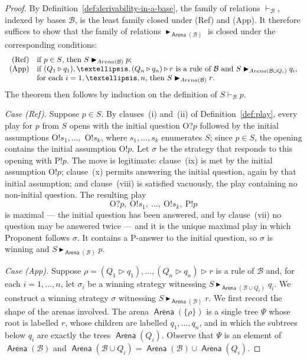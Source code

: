 \documentclass[10pt,a4paper]{amsart}
\newcommand{\base}[1]{\mathcal{#1}}                    %
\newcommand{\brule}[1]{\triangleright{#1}}         %
\newcommand{\deriv}[1]{\vdash_{#1}}       %
\newcommand{\toarena}[1]{\mathrel{\textsf{Arena}}(#1)}           %
\newcommand{\wstrat}[1]{\blacktriangleright_{#1}}            %
\begin{document}
\begin{proof}
By Definition~\ref{def:derivability-in-a-base}, the family of relations
$\deriv{\base{B}}$, indexed by bases $\base{B}$, is the least family closed
under (Ref) and (App). It therefore suffices to show that the family of
relations $\wstrat{\toarena{\base{B}}}$ is closed under the corresponding
conditions:
\[
\begin{array}{rl}
    \mbox{\rm (Ref)} & \mbox{if $p \in S$, then $S \wstrat{\toarena{\base{B}}} p$;} \\
    \mbox{\rm (App)} & \mbox{if $(Q_1 \brule q_1), \ldots, (Q_n \brule q_n)
        \brule r$ is a rule of $\base{B}$ and
        $S \wstrat{\toarena{\base{B} \cup Q_i}} q_i$,} \\
        & \mbox{for each $i = 1, \ldots, n$, then $S \wstrat{\toarena{\base{B}}} r$.}
\end{array}
\]
The theorem then follows by induction on the definition of
$S \deriv{\base{B}} p$.
 
\medskip
 
\noindent\emph{Case (Ref).} Suppose $p \in S$. By clauses~(i) and~(ii) of
Definition~\ref{def:play}, every play for $p$ from $S$ opens with the initial
question O?$p$ followed by the initial assumptions O!$s_1, \ldots,$ O!$s_k$,
where $s_1, \ldots, s_k$ enumerates $S$; since $p \in S$, the opening contains
the initial assumption O!$p$. Let $\sigma$ be the strategy that responds to
this opening with P!$p$. The move is legitimate: clause~(ix) is met by the
initial assumption O!$p$; clause~(x) permits answering the initial question,
again by that initial assumption; and clause~(viii) is satisfied vacuously,
the play containing no non-initial question. The resulting play
\[
\text{O?}p,\ \text{O!}s_1,\ \ldots,\ \text{O!}s_k,\ \text{P!}p
\]
is maximal --- the initial question has been answered, and by clause~(vii) no
question may be answered twice --- and it is the unique maximal play in which
Proponent follows $\sigma$. It contains a P-answer to the initial question,
so $\sigma$ is winning and $S \wstrat{\toarena{\base{B}}} p$.
 
\medskip
 
\noindent\emph{Case (App).} Suppose
$\rho = (Q_1 \brule q_1), \ldots, (Q_n \brule q_n) \brule r$ is a rule of
$\base{B}$ and, for each $i = 1, \ldots, n$, let $\sigma_i$ be a winning
strategy witnessing $S \wstrat{\toarena{\base{B} \cup Q_i}} q_i$. We
construct a winning strategy $\sigma$ witnessing
$S \wstrat{\toarena{\base{B}}} r$. We first record the shape of the arenas involved. The arena $\toarena{\{\rho\}}$ is a single
tree $\Psi$ whose root is labelled $r$, whose children are labelled
$q_1, \ldots, q_n$, and in which the subtrees below $q_i$ are exactly the
trees $\toarena{Q_i}$. Observe that
$\Psi$ is an element of $\toarena{\base{B}}$ and
$\toarena{\base{B} \cup Q_i} = \toarena{\base{B}} \cup \toarena{Q_i}$.
 

\end{proof}
\end{document}
